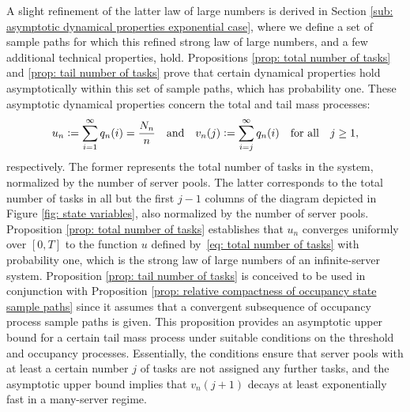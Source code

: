 \documentclass[a4paper, 12pt]{article}
\theoremstyle{definition}
\newcommand{\defeq}{\vcentcolon=}
\begin{document}
A slight refinement of the latter law of large numbers is derived in Section \ref{sub: asymptotic dynamical properties exponential case}, where we define a set of sample paths for which this refined strong law of large numbers, and a few additional technical properties, hold. Propositions \ref{prop: total number of tasks} and \ref{prop: tail number of tasks} prove that certain dynamical properties hold asymptotically within this set of sample paths, which has probability one. These asymptotic dynamical properties concern the total and tail mass processes:
\begin{equation}
	\label{eq: total and tail mass processes}
	u_n \defeq \sum_{i = 1}^\infty q_n(i) = \frac{N_n}{n} \quad \text{and} \quad v_n(j) \defeq \sum_{i = j}^\infty q_n(i) \quad \text{for all} \quad j \geq 1,
\end{equation}
respectively. The former represents the total number of tasks in the system, normalized by the number of server pools. The latter corresponds to the total number of tasks in all but the first $j - 1$ columns of the diagram depicted in Figure \ref{fig: state variables}, also normalized by the number of server pools. Proposition \ref{prop: total number of tasks} establishes that $u_n$ converges uniformly over $[0, T]$ to the function $u$ defined by~\eqref{eq: total number of tasks} with probability one, which is the strong law of large numbers of an infinite-server system. Proposition \ref{prop: tail number of tasks} is conceived to be used in conjunction with Proposition \ref{prop: relative compactness of occupancy state sample paths} since it assumes that a convergent subsequence of occupancy process sample paths is given. This proposition provides an asymptotic upper bound for a certain tail mass process under suitable conditions on the threshold and occupancy processes. Essentially, the conditions ensure that server pools with at least a certain number $j$ of tasks are not assigned any further tasks, and the asymptotic upper bound implies that $v_n(j + 1)$ decays at least exponentially fast in a many-server regime.
\end{document}

